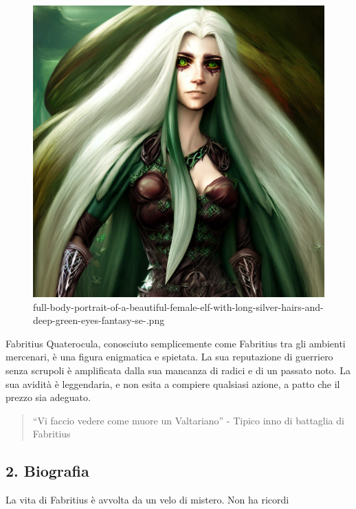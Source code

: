 \begin{figure}
\centering
\includegraphics{full-body-portrait-of-a-beautiful-female-elf-with-long-silver-hairs-and-deep-green-eyes-fantasy-se-.png}
\caption{full-body-portrait-of-a-beautiful-female-elf-with-long-silver-hairs-and-deep-green-eyes-fantasy-se-.png}
\end{figure}

Fabritius Quaterocula, conosciuto semplicemente come Fabritius tra gli
ambienti mercenari, è una figura enigmatica e spietata. La sua
reputazione di guerriero senza scrupoli è amplificata dalla sua mancanza
di radici e di un passato noto. La sua avidità è leggendaria, e non
esita a compiere qualsiasi azione, a patto che il prezzo sia adeguato.

\begin{quote}
``Vi faccio vedere come muore un Valtariano'' - Tipico inno di battaglia
di Fabritius
\end{quote}

\subsection{2. Biografia}\label{biografia}


La vita di Fabritius è avvolta da un velo di mistero. Non ha ricordi
